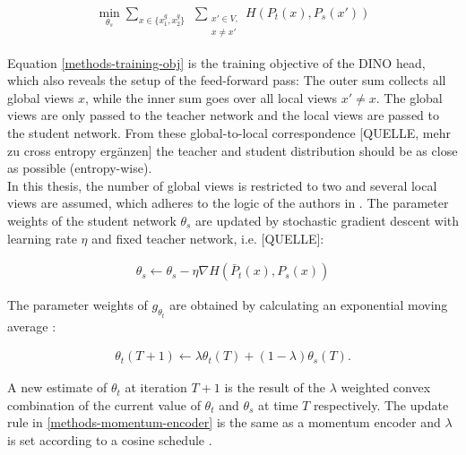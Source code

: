 \begin{align}
	\min_{\theta_s}\sum_{x \in \{x_1^g, x_2^g\}} \hspace{5pt} \sum_{\substack{ x'\in V, \\ x\neq x'}} H(P_t(x),P_s(x'))
	\label{methods-training-obj}
\end{align}

Equation \ref{methods-training-obj} is the training objective of the DINO head, which also reveals the setup of the feed-forward pass:
The outer sum collects all global views $x$, while the inner sum goes over all local views $x'\neq x$.
The global views are only passed to the teacher network and the local views are passed to the student network.
From these global-to-local correspondence [QUELLE, mehr zu cross entropy ergänzen] the teacher and student distribution should be as close as possible (entropy-wise).
\\
In this thesis, the number of global views is restricted to two and several local views are assumed, which adheres to the logic of the authors in \citep{Caron2021}. 
The parameter weights of the student network $\theta_s$ are updated by stochastic gradient descent with learning rate $\eta$ and fixed teacher network, i.e. [QUELLE]:

\begin{align}
	\theta_s \leftarrow \theta_s - \eta \nabla H(\bar{P}_t(x),P_s(x))
\end{align}

The parameter weights of $g_{\theta_t}$ are obtained by calculating an exponential moving average \citep{Grill2020,Caron2021}: 

\begin{align}
	\theta_t(T+1) \leftarrow \lambda \theta_t(T) + (1-\lambda) \theta_s(T).
	\label{methods-momentum-encoder}
\end{align}

A new estimate of $\theta_t$ at iteration $T+1$ is the result of the $\lambda$ weighted convex combination of the current value of $\theta_t$ and $\theta_s$ at time $T$ respectively.
The update rule in \ref{methods-momentum-encoder} is the same as a momentum encoder \citep{He2019} and $\lambda$ is set according to a cosine schedule \citep{Grill2020}.
